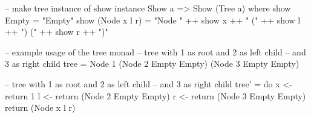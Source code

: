 \documentclass[a4paper,landscape,10pt]{article}
\begin{document}
\begin{multicols*}{2}
\begin{haskell}
-- make tree instance of show
  instance Show a => Show (Tree a) where
  show Empty = "Empty"
  show (Node x l r) = "Node " ++ show x ++ " (" ++ show l ++ ") (" ++ show r ++ ")"
\end{haskell}

  \begin{haskell}
-- example usage of the tree monad
-- tree with 1 as root and 2 as left child
-- and 3 as right child
tree = Node 1 (Node 2 Empty Empty) (Node 3 Empty Empty)

-- tree with 1 as root and 2 as left child
-- and 3 as right child
tree' = do
  x <- return 1
  l <- return (Node 2 Empty Empty)
  r <- return (Node 3 Empty Empty)
  return (Node x l r)
  \end{haskell}

\end{multicols*}

\clearpage
\end{document}
